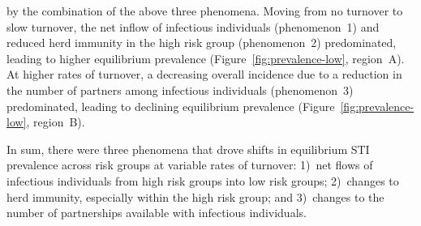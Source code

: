 by the combination of the above three phenomena.
Moving from no turnover to slow turnover,
the net inflow of infectious individuals (phenomenon~1)
and reduced herd immunity in the high risk group (phenomenon~2)
predominated, leading to higher equilibrium prevalence
(Figure~\ref{fig:prevalence-low}, region~A).
At higher rates of turnover,
a decreasing overall incidence due to
a reduction in the number of partners among infectious individuals (phenomenon~3)
predominated, leading to declining equilibrium prevalence
(Figure~\ref{fig:prevalence-low}, region~B).
\par
In sum, there were three phenomena that
drove shifts in equilibrium STI prevalence across risk groups
at variable rates of turnover:
1)~net flows of infectious individuals from high risk groups into low risk groups;
2)~changes to herd immunity, especially within the high risk group; and
3)~changes to the number of partnerships available with infectious individuals.
